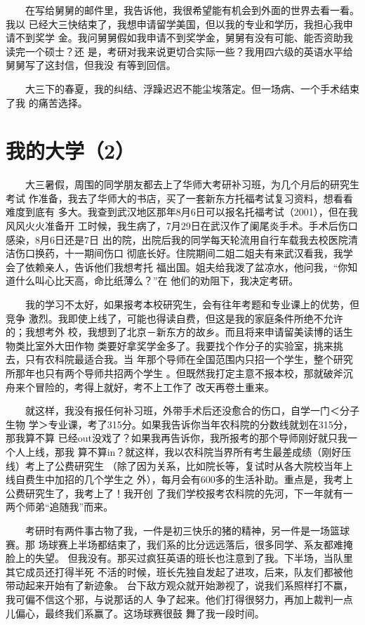 \documentclass[12pt]{book}
\begin{document}
　　在写给舅舅的邮件里，我告诉他，我很希望能有机会到外面的世界去看一看。我以
已经大三快结束了，我想申请留学美国，但以我的专业和学历，我担心我申请不到奖学
金。我问舅舅假如我申请不到奖学金，舅舅有没有可能、能否资助我读完一个硕士？还
是，考研对我来说更切合实际一些？我用四六级的英语水平给舅舅写了这封信，但我没
有等到回信。

　　大三下的春夏，我的纠结、浮躁迟迟不能尘埃落定。但一场病、一个手术结束了我
的痛苦选择。
\section{我的大学（2）}
\label{sec-4-2}

　　大三暑假，周围的同学朋友都去上了华师大考研补习班，为几个月后的研究生考试
作准备，我去了华师大的书店，买了一套新东方托福考试复习资料，想看看难度到底有
多大。我查到武汉地区那年8月6日可以报名托福考试（2001），但在我风风火火准备开
工时候，我生病了，7月29日在武汉作了阑尾炎手术。手术后伤口感染，8月6日还是7日
出的院，出院后我的同学每天轮流用自行车载我去校医院清洁伤口换药，十一期间伤口
彻底长好。住院期间二姐二姐夫有来武汉看我，我学会了依赖亲人，告诉他们我想考托
福出国。姐夫给我泼了盆凉水，他问我，“你知道什么叫心比天高，命比纸薄么？”在
他们的劝阻下，我决定考研。

　　我的学习不太好，如果报考本校研究生，会有往年考题和专业课上的优势，但竞争
激烈。我即使上线了，可能也得读自费，但这是我的家庭条件所绝不允许的；我想考外
校，我想到了北京－新东方的故乡。而且将来申请留美读博的话生物类比室外大田作物
类要好拿奖学金多了。我要找个作分子的实验室，挑来挑去，只有农科院最适合我。当
年那个导师在全国范围内只招一个学生，整个研究所那年也只有两个导师共招两个学生
。但既然我打定主意不报本校，那就破斧沉舟来个冒险的，考得上就好，考不上工作了
改天再卷土重来。

　　就这样，我没有报任何补习班，外带手术后还没愈合的伤口，自学一门＜分子生物
学＞专业课，考了315分。如果我告诉你当年农科院的分数线就划在315分，那我算不算
已经out没戏了？如果我再告诉你，我所报考的那个导师刚好就只我一个人上线，那我
算不算in？就这样，我以农科院当界所有考生最差成绩（刚好压线）考上了公费研究生
（除了因为关系，比如院长等，复试时从各大院校当年上线自费生中加招的几个学生之
外），每月会有600多的生活补助。重点是，我考上公费研究生了，我考上了！我开创
了我们学校报考农科院的先河，下一年就有一两个师弟“追随我”而来。

　　考研时有两件事古物了我，一件是初三快乐的猪的精神，另一件是一场篮球赛。那
场球赛上半场都结束了，我们系的比分远远落后，很多同学、系友都难掩脸上的失望。
但我没有。那买过疯狂英语的班长也注意到了我。下半场，当队里其它成员还打得半死
不活的时候，班长先独自发起了进攻，后来，队友们都被他带动起来开始有了新迹象。
台下敌方观众就开始渺视了，说我们系照样打不赢，我可偏不信这个邪，与说那话的人
争了起来。他们打得很努力，再加上裁判一点儿偏心，最终我们系赢了。这场球赛很鼓
舞了我一段时间。
\end{document}
